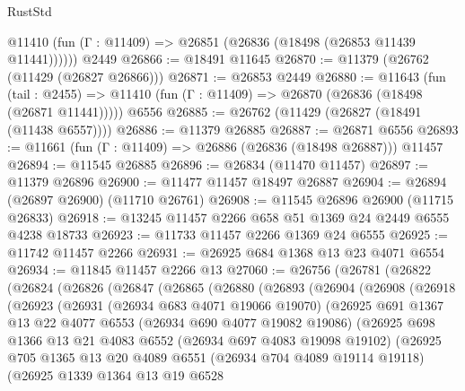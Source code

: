 \begin{lexlean}{RustStd}
\begin{coremodule}
      @11410 (fun (Γ : @11409) => @26851 (@26836 (@18498 (@26853 @11439 @11441))))))
    @2449
@26866 := @18491 @11645
@26870 := @11379 (@26762 (@11429 (@26827 @26866)))
@26871 := @26853 @2449
@26880 := @11643
    (fun (tail : @2455) => @11410 (fun (Γ : @11409) => @26870 (@26836 (@18498 (@26871 @11441)))))
    @6556
@26885 := @26762 (@11429 (@26827 (@18491 (@11438 @6557))))
@26886 := @11379 @26885
@26887 := @26871 @6556
@26893 := @11661 (fun (Γ : @11409) => @26886 (@26836 (@18498 @26887))) @11457
@26894 := @11545 @26885
@26896 := @26834 (@11470 @11457)
@26897 := @11379 @26896
@26900 := @11477 @11457 @18497 @26887
@26904 := @26894 (@26897 @26900) (@11710 @26761)
@26908 := @11545 @26896 @26900 (@11715 @26833)
@26918 := @13245 @11457 @2266 @658 @51 @1369 @24 @2449 @6555 @4238 @18733
@26923 := @11733 @11457 @2266 @1369 @24 @6555
@26925 := @11742 @11457 @2266
@26931 := @26925 @684 @1368 @13 @23 @4071 @6554
@26934 := @11845 @11457 @2266 @13
@27060 := @26756
    (@26781
      (@26822
        (@26824
          (@26826
            (@26847
              (@26865
                (@26880
                  (@26893
                    (@26904
                      (@26908
                        (@26918
                          (@26923
                            (@26931
                              (@26934 @683 @4071 @19066 @19070)
                              (@26925
                                @691
                                @1367
                                @13
                                @22
                                @4077
                                @6553
                                (@26934 @690 @4077 @19082 @19086)
                                (@26925
                                  @698
                                  @1366
                                  @13
                                  @21
                                  @4083
                                  @6552
                                  (@26934 @697 @4083 @19098 @19102)
                                  (@26925
                                    @705
                                    @1365
                                    @13
                                    @20
                                    @4089
                                    @6551
                                    (@26934 @704 @4089 @19114 @19118)
                                    (@26925
                                      @1339
                                      @1364
                                      @13
                                      @19
                                      @6528

\end{coremodule}
\end{lexlean}
